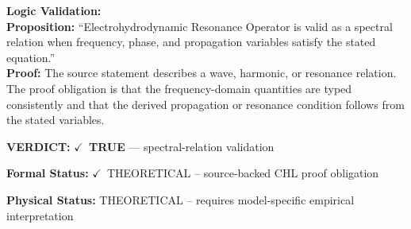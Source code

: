 \textbf{Logic Validation:}\\
\textbf{Proposition:} ``Electrohydrodynamic Resonance Operator is valid as a spectral relation when frequency,
phase, and propagation variables satisfy the stated equation.''\\
\textbf{Proof:} The source statement describes a wave, harmonic, or resonance relation. The proof
obligation is that the frequency-domain quantities are typed consistently and that the
derived propagation or resonance condition follows from the stated variables.

\textbf{VERDICT:} \ensuremath{\checkmark}\ \textbf{TRUE} --- spectral-relation validation

\textbf{Formal Status:} \ensuremath{\checkmark}\ THEORETICAL -- source-backed CHL proof obligation

\textbf{Physical Status:} THEORETICAL -- requires model-specific empirical interpretation
\par\vspace{0.45em}
\par
\ifTZPDarkEdition
{}
\fi
\endgroup
\endgroup

